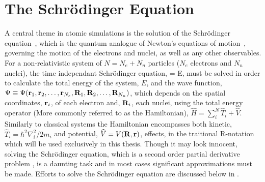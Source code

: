 \section{The Schr\"odinger Equation}
\label{sec:scrodinger}

A central theme in atomic simulations is the solution of the Schr\"odinger equation~\cite{scrodinger-equation-1926}, which is the quantum analogue of Newton's equations of motion~\cite{newton-latin}, governing the motion of the electrons and nuclei, as well as any other observables.
For a non-relativistic system of $N = N_e + N_n$ particles ($N_e$ electrons and $N_n$ nuclei), the time independant Schr\"odinger equation,
 \Psi = E\Psi,
\eeq
must be solved in order to calculate the total energy of the system, $E$, and the wave function, $\Psi \equiv \Psi({\mathrm{\mathbf{\bm{r}}}}_1, {\mathrm{\mathbf{\bm{r}}}}_2, \ldots, {\mathrm{\mathbf{\bm{r}}}}_{N_e}, {\mathrm{\mathbf{\bm{R}}}}_1, {\mathrm{\mathbf{\bm{R}}}}_2, \ldots, {\mathrm{\mathbf{\bm{R}}}}_{N_n})$, which depends on the spatial coordinates, ${\mathrm{\mathbf{\bm{r}}}}_i$, of each electron and, ${\mathrm{\mathbf{\bm{R}}}}_i$, each nuclei, using the total energy operator (More commonly referred to as the Hamiltonian), $\widehat{H} = \sum_i^{N}\widehat{T}_i  + \widehat{V}$.
Similarly to classical systems the Hamiltonian encompasses both kinetic, $\widehat{T}_i = \hbar^2\nabla_i^2/2m_i$ and potential, $\widehat{V} = V({\mathrm{\mathbf{\bm{R}}}}, {\mathrm{\mathbf{\bm{r}}}})$, effects, in the traitional R-notation which will be used exclusively in this thesis.
Though it may look innocent, solving the Schr\"odinger equation, which is a second order partial derivative problem , is a daunting task and in most cases significant approximations must be made.
Efforts to solve the Schr\"odinger equation are discussed below in .
